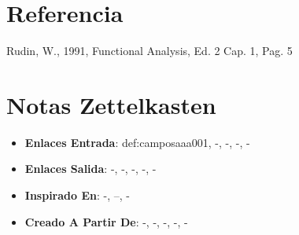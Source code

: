 \documentclass[12pt]{article}
\begin{document}
\section*{Referencia}
Rudin, W., 1991, Functional Analysis, Ed. 2 Cap. 1, Pag. 5 

\section*{Notas Zettelkasten}
\begin{itemize}
  \item \textbf{Enlaces Entrada}: def:camposaaa001, -, -, -, -
  \item \textbf{Enlaces Salida}: -, -, -, -, -
  \item \textbf{Inspirado En}: -, --, -
  \item \textbf{Creado A Partir De}: -, -, -, -, -
\end{itemize}
\end{document}
